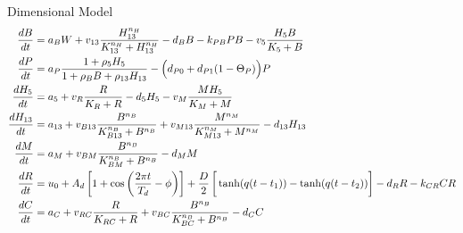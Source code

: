 \documentclass[aspectratio=169,11pt]{beamer}
\begin{document}
\begin{frame}{Dimensional Model}
  \centering
  \vspace{-0.05cm}
  \setlength{\jot}{3.6pt}
  \footnotesize
  \begin{align*}
    \frac{dB}{dt}      &= a_BW+v_{13}\frac{H_{13}^{n_H}}{K_{13}^{n_H}+H_{13}^{n_H}}
                          -d_BB-k_{PB}PB-v_5\frac{H_5B}{K_5+B}\\
    \frac{dP}{dt}      &= a_P\frac{1+\rho_5H_5}{1+\rho_BB+\rho_{13}H_{13}}
                          -\Bigl(d_{P0}+d_{P1}(1-\Theta_P)\Bigr)P\\
    \frac{dH_5}{dt}    &= a_5+v_R\frac{R}{K_R+R}-d_5H_5-v_M\frac{MH_5}{K_M+M}\\
    \frac{dH_{13}}{dt} &= a_{13}+v_{B13}\frac{B^{n_B}}{K_{B13}^{n_B}+B^{n_B}}
                          +v_{M13}\frac{M^{n_M}}{K_{M13}^{n_M}+M^{n_M}}-d_{13}H_{13}\\
    \frac{dM}{dt}      &= a_M+v_{BM}\frac{B^{n_B}}{K_{BM}^{n_B}+B^{n_B}}-d_MM\\
    \frac{dR}{dt}      &= u_0+A_d\left[1+\cos\left(\frac{2\pi t}{T_d}-\phi\right)\right]
                          +\frac{D}{2}\left[\vphantom{\left(\frac{2\pi t}{T_d}-\phi\right)}\tanh(q(t-t_1))-\tanh(q(t-t_2))\right]
                          -d_RR-k_{CR}CR\\
    \frac{dC}{dt}      &= a_C+v_{RC}\frac{R}{K_{RC}+R}
                          +v_{BC}\frac{B^{n_B}}{K_{BC}^{n_B}+B^{n_B}}-d_CC
  \end{align*}
\end{frame}
\end{document}
